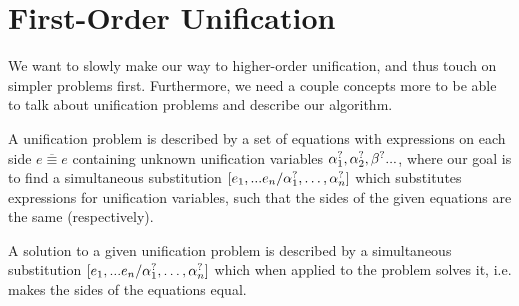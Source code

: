 \documentclass[twoside,12pt,a4paper]{article}
\begin{document}
\begin{minipage}{0.45\textwidth}
    \begin{prooftree}
    \end{prooftree}    
\end{minipage}
\begin{minipage}{0.45\textwidth}
    \begin{prooftree}
    \end{prooftree}    
\end{minipage}

\begin{prooftree}
\end{prooftree}
\begin{prooftree}
\end{prooftree}    


\section{First-Order Unification}\label{sec:First-Order Unification}

We want to slowly make our way to higher-order unification, and thus touch on simpler problems first. 
Furthermore, we need a couple concepts more to be able to talk about unification problems and describe our algorithm. 

A unification problem is described by a set of equations with expressions on each side $\overline{e\equiv e}$ containing unknown unification variables $\alphaunifvar_1, \alphaunifvar_2, \betaunifvar...$, 
where our goal is to find a simultaneous substitution $[\listofexpr / \alphaunifvar_1, \dots, \alphaunifvar_n]$ which substitutes expressions for unification variables, 
such that the sides of the given equations are the same (respectively). 

\begin{definition}[Solution]
    A solution to a given unification problem is described by a simultaneous substitution $[\listofexpr / \alphaunifvar_1, \dots, \alphaunifvar_n]$
    which when applied to the problem solves it, i.e. makes the sides of the equations equal.
\end{definition}
    
\end{document}
